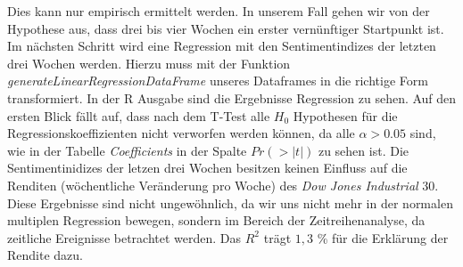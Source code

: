 Dies kann nur empirisch ermittelt werden. In unserem Fall gehen wir von der Hypothese aus, dass drei bis vier Wochen ein erster vernünftiger Startpunkt ist. Im nächsten Schritt wird eine Regression mit den Sentimentindizes der letzten drei Wochen werden. Hierzu muss mit der Funktion \textit{generateLinearRegressionDataFrame} unseres Dataframes in die richtige Form transformiert. In der R Ausgabe sind die Ergebnisse Regression zu sehen. Auf den ersten Blick fällt auf, dass nach dem T-Test alle $H_{0}$ Hypothesen für die Regressionskoeffizienten nicht verworfen werden können, da alle $\alpha>0.05$ sind, wie in der Tabelle \textit{Coefficients} in der Spalte $Pr(>|t|)$ zu sehen ist. Die Sentimentinidizes der letzen drei Wochen besitzen keinen Einfluss auf die Renditen (wöchentliche Veränderung pro Woche)  des \textit{Dow Jones Industrial} $30$. Diese Ergebnisse sind nicht ungewöhnlich, da wir uns nicht mehr in der normalen multiplen Regression bewegen, sondern im Bereich der Zeitreihenanalyse, da zeitliche Ereignisse betrachtet werden. Das $R^2$ trägt $1,3$ \% für die Erklärung der Rendite dazu. 

